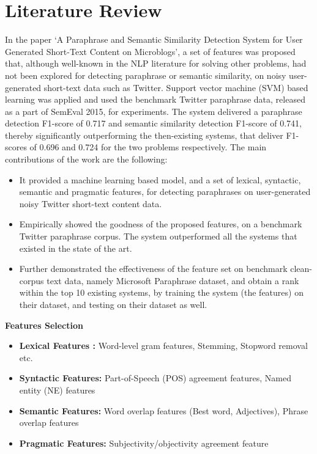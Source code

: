 \chapter{Literature Review}
In the paper `A Paraphrase and Semantic Similarity Detection System for User Generated Short-Text Content on Microblogs', a set of features was proposed that, although well-known in the NLP literature for solving other problems, had not been explored for detecting paraphrase or semantic similarity, on noisy user-generated short-text data such as Twitter. Support vector machine (SVM) based learning was applied and used the benchmark Twitter paraphrase data, released as a part of SemEval 2015, for experiments. The system delivered a paraphrase detection F1-score of 0.717 and semantic similarity detection F1-score of 0.741, thereby significantly outperforming the then-existing systems, that deliver F1-scores of 0.696 and 0.724 for the two problems respectively.\cite{Dey2016APA}
The main contributions of the work are the following:
\begin{itemize}
 \item It provided a machine learning based model, and a set of lexical, syntactic, semantic and pragmatic features, for detecting paraphrases on user-generated noisy Twitter short-text content data.
 \item Empirically showed the goodness of the proposed features, on a benchmark Twitter paraphrase corpus. The system outperformed all the systems that existed in the state of the art.
 \item Further demonstrated the effectiveness of the feature set on benchmark clean-corpus text data, namely Microsoft Paraphrase dataset, and obtain a rank within the top 10 existing systems, by training the system (the features) on their dataset, and testing on their dataset as well.
\end{itemize}

\textbf{Features Selection}
\begin{itemize}
	\item \textbf{Lexical Features :} Word-level gram features, Stemming, Stopword removal etc.
	\item \textbf{Syntactic Features: } Part-of-Speech (POS) agreement features, Named entity (NE) features
	\item \textbf{Semantic Features: } Word overlap features (Best word, Adjectives), Phrase overlap features 
	\item \textbf{Pragmatic Features: } Subjectivity/objectivity agreement feature
\end{itemize}

